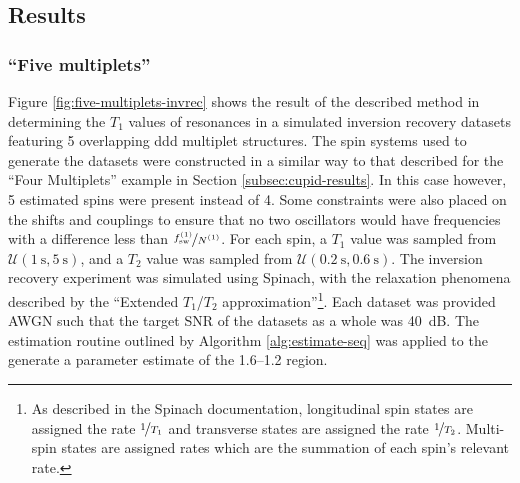 \subsection{Results}

\subsubsection{``Five multiplets''}
Figure \ref{fig:five-multiplets-invrec} shows the result of the described
method in determining the $T_1$ values of resonances in a simulated inversion
recovery datasets featuring 5 overlapping ddd multiplet structures. The spin
systems used to generate the datasets were constructed in a similar way to that
described for the ``Four Multiplets'' example in
Section \ref{subsec:cupid-results}. In this case however, 5 estimated spins were
present instead of 4. Some constraints were also placed on the shifts and
couplings to ensure that no two oscillators would have frequencies with a
difference less than $\nicefrac{f_{\mathrm{sw}}^{(1)}}{N^{(1)}}$. For each spin, a $T_1$ value
was sampled from $\mathcal{U}(\qty{1}{\second}, \qty{5}{\second})$, and a $T_2$
value was sampled from  $\mathcal{U}(\qty{0.2}{\second}, \qty{0.6}{\second})$.
The inversion recovery experiment was simulated using Spinach, with the
relaxation phenomena described by the ``Extended $T_1$/$T_2$
approximation''\footnote{
    As described in the Spinach documentation\cite{SpinachDocs}, longitudinal
    spin states are assigned the rate $\nicefrac{1}{T_1}$ and transverse states
    are assigned the rate $\nicefrac{1}{T_2}$. Multi-spin states are assigned
    rates which are the summation of each spin's relevant rate.
}. Each dataset was provided \ac{AWGN} such that the target \ac{SNR} of the
datasets as a whole was \qty{40}{\deci\bel}.
The estimation routine outlined by Algorithm \ref{alg:estimate-seq} was applied
to the generate a parameter estimate of the
\SIrange{1.6}{1.2}{\partspermillion} region.
